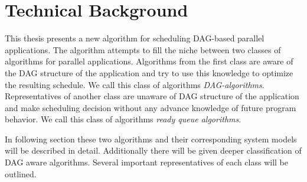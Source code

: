 \chapter{Technical Background}
\label{sec:state}






This thesis presents a new algorithm for scheduling DAG-based parallel
applications. The algorithm attempts to fill the niche between two
classes of algorithms for parallel applications. Algorithms from the
first class are aware of the DAG structure of the application and try
to use this knowledge to optimize the resulting schedule. We call this
class of algorithms \emph{DAG-algorithms}. Representatives of another class are
unaware of DAG structure of the application and make scheduling
decision without any advance knowledge of future program behavior. We
call this class of algorithms \emph{ready queue algorithms}.

In following section these two algorithms and their corresponding
system models will be described in detail. Additionally there will be
given deeper classification of DAG aware algorithms. Several important
representatives of each class will be outlined.


